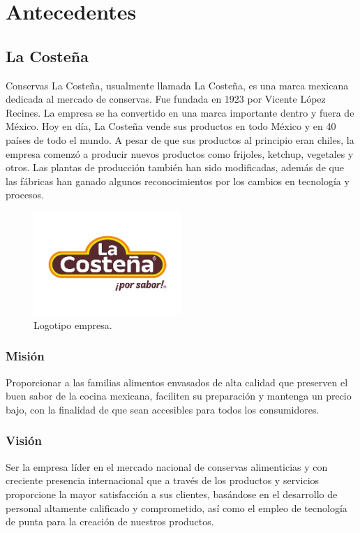 \documentclass[12pt,letterpaper]{article}
\begin{document}


\newpage
\tableofcontents
\listoffigures
\listoftables

\newpage
\section{Antecedentes}
\subsection{La Costeña}
Conservas La Costeña, usualmente llamada La Costeña, es una marca mexicana dedicada al mercado de conservas. 
Fue fundada en 1923 por Vicente López Recines. La empresa se ha convertido en una marca importante dentro y fuera de México. 
Hoy en día, La Costeña vende sus productos en todo México y en 40 países de todo el mundo. A pesar de que sus productos al principio eran chiles, 
la empresa comenzó a producir nuevos productos como frijoles, ketchup, vegetales y otros. Las plantas de producción también han sido modificadas, 
además de que las fábricas han ganado algunos reconocimientos por los cambios en tecnología y procesos. \cite{lacostena}

\begin{figure}[ht]
    \centering
    \includegraphics[width=0.5\textwidth]{imagenes/lacostena.jpg}
    \caption{Logotipo empresa.}
\end{figure}

\subsubsection{Misión}
Proporcionar a las familias alimentos envasados de alta calidad que preserven el buen sabor de la cocina mexicana, 
faciliten su preparación y mantenga un precio bajo, con la finalidad de que sean accesibles para todos los consumidores.

\subsubsection{Visión}
Ser la empresa líder en el mercado nacional de conservas alimenticias y con creciente presencia internacional que a 
través de los productos y servicios proporcione la mayor satisfacción a sus clientes, basándose en el desarrollo de personal 
altamente calificado y comprometido, así como el empleo de tecnología de punta para la creación de nuestros productos.
\end{document}

